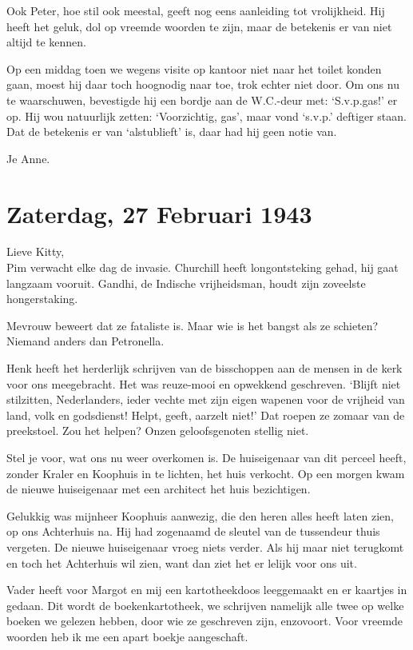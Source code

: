 \documentclass{book}
\begin{document}
Ook Peter, hoe stil ook meestal, geeft nog eens aanleiding tot vrolijkheid. Hij
heeft het geluk, dol op vreemde woorden te zijn, maar de betekenis er van niet
altijd te kennen.

Op een middag toen we wegens visite op kantoor niet naar het toilet konden gaan,
moest hij daar toch hoognodig naar toe, trok echter niet door. Om ons nu te
waarschuwen, bevestigde hij een bordje aan de W.C.-deur met: `S.v.p.gas!' er op.
Hij wou natuurlijk zetten: `Voorzichtig, gas', maar vond `s.v.p.' deftiger
staan. Dat de betekenis er van `alstublieft' is, daar had hij geen notie van.

Je Anne.

\section*{Zaterdag, 27 Februari 1943}

Lieve Kitty,\\
Pim verwacht elke dag de invasie. Churchill heeft longontsteking
gehad, hij gaat langzaam vooruit. Gandhi, de Indische vrijheidsman, houdt zijn
zoveelste hongerstaking.

Mevrouw beweert dat ze fataliste is. Maar wie is het bangst als ze schieten?
Niemand anders dan Petronella.

Henk heeft het herderlijk schrijven van de bisschoppen aan de mensen in de kerk
voor ons meegebracht. Het was reuze-mooi en opwekkend geschreven. `Blijft niet
stilzitten, Nederlanders, ieder vechte met zijn eigen wapenen voor de vrijheid
van land, volk en godsdienst! Helpt, geeft, aarzelt niet!' Dat roepen ze zomaar
van de preekstoel. Zou het helpen? Onzen geloofsgenoten stellig niet.

Stel je voor, wat ons nu weer overkomen is. De huiseigenaar van dit perceel
heeft, zonder Kraler en Koophuis in te lichten, het huis verkocht. Op een morgen
kwam de nieuwe huiseigenaar met een architect het huis bezichtigen.

Gelukkig was mijnheer Koophuis aanwezig, die den heren alles heeft laten zien,
op ons Achterhuis na. Hij had zogenaamd de sleutel van de tussendeur thuis
vergeten. De nieuwe huiseigenaar vroeg niets verder.  Als hij maar niet
terugkomt en toch het Achterhuis wil zien, want dan ziet het er lelijk voor ons
uit.

Vader heeft voor Margot en mij een kartotheekdoos leeggemaakt en er kaartjes in
gedaan. Dit wordt de boekenkartotheek, we schrijven namelijk alle twee op welke
boeken we gelezen hebben, door wie ze geschreven zijn, enzovoort. Voor vreemde
woorden heb ik me een apart boekje aangeschaft.
\end{document}
